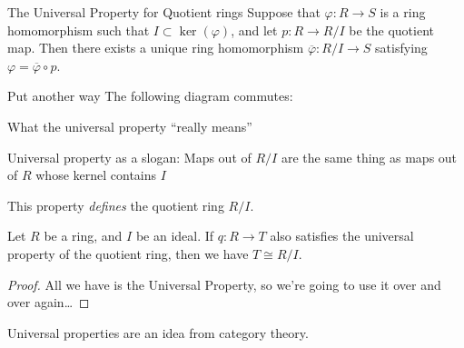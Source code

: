 \documentclass{beamer}
\begin{document}
\begin{frame}[fragile]{The Universal Property for Quotient rings}
Suppose that $\varphi:R \to S$ is a ring homomorphism such that $I\subset \ker(\varphi)$, and let $p:R\to R/I$ be the quotient map.   Then there exists a unique ring homomorphism $\overline{\varphi}:R/I\to S$ satisfying $\varphi=\overline{\varphi}\circ p$.

\begin{block}{Put another way}
The following diagram commutes:
\begin{center}
\end{center}
\end{block}

\end{frame}

\begin{frame}{What the universal property ``really means''}
\begin{block}{Universal property as a slogan:}
Maps out of $R/I$ are the same thing as maps out of $R$ whose kernel contains $I$
\end{block}

This property \emph{defines} the quotient ring $R/I$.

\begin{lemma} Let $R$ be a ring, and $I$ be an ideal.  If $q:R\to T$ also satisfies the universal property of the quotient ring, then we have $T\cong R/I$.
\end{lemma}

\begin{proof}
 All we have is the Universal Property, so we're going to use it over and over again\dots
  \end{proof}
Universal properties are an idea from { category theory}.
\end{frame}
\end{document}
